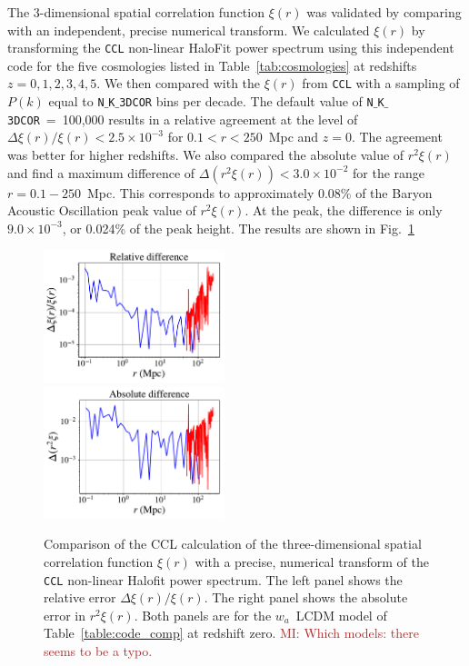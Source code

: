 \documentclass[\docopts]{\docclass}
\newcommand{\mi}[1]{\textcolor{brown}{MI: #1}}
\newcommand{\ccl}{{\tt CCL}\xspace}
\begin{document}
  
The 3-dimensional spatial correlation function $\xi(r)$ was validated by comparing with an independent, precise numerical transform. We calculated $\xi(r)$ 
by transforming the \ccl non-linear HaloFit power spectrum using this independent code for the five cosmologies listed in Table~\ref{tab:cosmologies} at 
redshifts $z = 0,1,2,3,4,5$.  We then compared with the $\xi(r)$ from \ccl with a sampling of $P(k)$ 
equal to {\tt N$\_$K$\_$3DCOR} bins per decade. The default value of {\tt N$\_$K$\_$3DCOR}~=~100,000 results in a relative agreement 
at the level of $\Delta \xi(r) / \xi(r) < 2.5 \times 10^{-3}$ for $0.1 < r < 250$~Mpc and $z=0$. The agreement was better for higher redshifts.
We also compared the absolute value of $r^2 \xi(r)$ and find a maximum difference of $\Delta (r^2 \xi(r)) < 3.0 \times 10^{-2}$ for the range 
$r = 0.1 - 250$~Mpc. This corresponds to approximately $0.08\%$ of the Baryon Acoustic Oscillation peak value of $r^2 \xi(r)$. At the peak, the difference is only $9.0 \times 10^{-3}$, or 0.024\% of the peak height. The results are shown in Fig.~\ref{fig:benchmark_xi}
%
\begin{figure}
\centering
\includegraphics[width=0.47\textwidth]{benchmark_xi_rel} ~~~
\includegraphics[width=0.47\textwidth]{benchmark_xi_abs} 
\caption{Comparison of the CCL calculation of the three-dimensional spatial correlation function $\xi(r)$ with a precise, numerical transform of the \ccl non-linear Halofit power spectrum. The left panel shows the relative error $\Delta \xi(r) / \xi(r)$. The right panel shows the absolute error in $r^2 \xi(r)$. Both panels are for the $w_a$~LCDM model of Table~\ref{table:code_comp} at redshift zero. \mi{Which models: there seems to be a typo.}}
\label{fig:benchmark_xi}
\end{figure}
%
\end{document}
